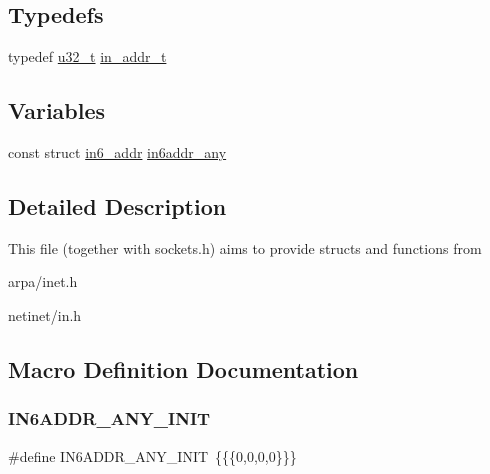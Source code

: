 \subsection*{Typedefs}
\begin{DoxyCompactItemize}
\item 
typedef \hyperlink{group__compiler__abstraction_ga4c14294869aceba3ef9d4c0c302d0f33}{u32\+\_\+t} \hyperlink{openmote-cc2538_2lwip_2src_2include_2lwip_2inet_8h_ab4fa3cac7cd90edc5ceb4efca7ec0059}{in\+\_\+addr\+\_\+t}
\end{DoxyCompactItemize}
\subsection*{Variables}
\begin{DoxyCompactItemize}
\item 
const struct \hyperlink{structin6__addr}{in6\+\_\+addr} \hyperlink{openmote-cc2538_2lwip_2src_2include_2lwip_2inet_8h_af8c97553060738d9edd6bfeab13ef7c3}{in6addr\+\_\+any}
\end{DoxyCompactItemize}


\subsection{Detailed Description}
This file (together with sockets.\+h) aims to provide structs and functions from
\begin{DoxyItemize}
\item arpa/inet.\+h
\item netinet/in.\+h 
\end{DoxyItemize}

\subsection{Macro Definition Documentation}
\mbox{\label{openmote-cc2538_2lwip_2src_2include_2lwip_2inet_8h_a1de876a356ee05a2e9427b741f99f49c}} 
\subsubsection{\texorpdfstring{I\+N6\+A\+D\+D\+R\+\_\+\+A\+N\+Y\+\_\+\+I\+N\+IT}{IN6ADDR\_ANY\_INIT}}
{\footnotesize\ttfamily \#define I\+N6\+A\+D\+D\+R\+\_\+\+A\+N\+Y\+\_\+\+I\+N\+IT~\{\{\{0,0,0,0\}\}\}}

